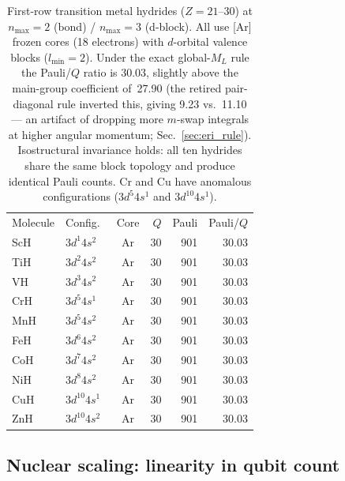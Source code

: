\documentclass[twocolumn,pra,amsmath,amssymb,superscriptaddress]{revtex4-2}
\newcommand{\gvq}[2]{#2}
\begin{document}
\begin{table}[h]
\caption{First-row transition metal hydrides ($Z = 21$--30) at $n_{\max}=2$
  (bond) / $n_{\max}=3$ (d-block).
  All use [Ar] frozen cores (18 electrons) with $d$-orbital valence
  blocks ($l_{\min} = 2$).  Under the exact global-$M_L$ rule the
  Pauli/$Q$ ratio is \gvq{composed_coeff_d}{30.03}, slightly above the main-group coefficient
  of~27.90 (the retired pair-diagonal rule inverted this, giving 9.23
  vs.\ 11.10 --- an artifact of dropping more $m$-swap integrals at higher
  angular momentum; Sec.~\ref{sec:eri_rule}).
  Isostructural invariance holds: all ten hydrides share the same
  block topology and produce identical Pauli counts.
  Cr and Cu have anomalous configurations ($3d^5 4s^1$ and $3d^{10} 4s^1$).}
\label{tab:transition_metals}
\begin{ruledtabular}
\begin{tabular}{llcrrr}
Molecule & Config.\ & Core & $Q$ & Pauli & Pauli/$Q$ \\
\colrule
ScH & $3d^1 4s^2$ & Ar & 30 & 901 & 30.03 \\
TiH & $3d^2 4s^2$ & Ar & 30 & 901 & 30.03 \\
VH  & $3d^3 4s^2$ & Ar & 30 & 901 & 30.03 \\
CrH & $3d^5 4s^1$ & Ar & 30 & 901 & 30.03 \\
MnH & $3d^5 4s^2$ & Ar & 30 & 901 & 30.03 \\
FeH & $3d^6 4s^2$ & Ar & 30 & 901 & 30.03 \\
CoH & $3d^7 4s^2$ & Ar & 30 & 901 & 30.03 \\
NiH & $3d^8 4s^2$ & Ar & 30 & 901 & 30.03 \\
CuH & $3d^{10} 4s^1$ & Ar & 30 & 901 & 30.03 \\
ZnH & $3d^{10} 4s^2$ & Ar & 30 & 901 & 30.03 \\
\end{tabular}
\end{ruledtabular}
\end{table}

\subsection{Nuclear scaling: linearity in qubit count}
\end{document}
